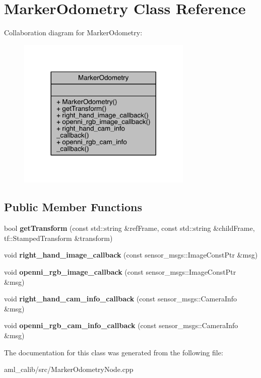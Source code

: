 \hypertarget{class_marker_odometry}{}\section{Marker\+Odometry Class Reference}
\label{class_marker_odometry}


Collaboration diagram for Marker\+Odometry\+:
\nopagebreak
\begin{figure}[H]
\begin{center}
\leavevmode
\includegraphics[width=236pt]{class_marker_odometry__coll__graph}
\end{center}
\end{figure}
\subsection*{Public Member Functions}
\begin{DoxyCompactItemize}
\item 
\hypertarget{class_marker_odometry_a991ccdf619ec3c08249f0e8c7b1dfb16}{}\label{class_marker_odometry_a991ccdf619ec3c08249f0e8c7b1dfb16} 
bool {\bfseries get\+Transform} (const std\+::string \&ref\+Frame, const std\+::string \&child\+Frame, tf\+::\+Stamped\+Transform \&transform)
\item 
\hypertarget{class_marker_odometry_a0830cb1778e608a0f3740ed7075d45b2}{}\label{class_marker_odometry_a0830cb1778e608a0f3740ed7075d45b2} 
void {\bfseries right\+\_\+hand\+\_\+image\+\_\+callback} (const sensor\+\_\+msgs\+::\+Image\+Const\+Ptr \&msg)
\item 
\hypertarget{class_marker_odometry_af6619fc8e9f0183bac7dc40c3a07d097}{}\label{class_marker_odometry_af6619fc8e9f0183bac7dc40c3a07d097} 
void {\bfseries openni\+\_\+rgb\+\_\+image\+\_\+callback} (const sensor\+\_\+msgs\+::\+Image\+Const\+Ptr \&msg)
\item 
\hypertarget{class_marker_odometry_adce78bf3c045cd8b6d543a10e926aeb4}{}\label{class_marker_odometry_adce78bf3c045cd8b6d543a10e926aeb4} 
void {\bfseries right\+\_\+hand\+\_\+cam\+\_\+info\+\_\+callback} (const sensor\+\_\+msgs\+::\+Camera\+Info \&msg)
\item 
\hypertarget{class_marker_odometry_a90f3cc35183a070f578f7f1f57b6c0d8}{}\label{class_marker_odometry_a90f3cc35183a070f578f7f1f57b6c0d8} 
void {\bfseries openni\+\_\+rgb\+\_\+cam\+\_\+info\+\_\+callback} (const sensor\+\_\+msgs\+::\+Camera\+Info \&msg)
\end{DoxyCompactItemize}


The documentation for this class was generated from the following file\+:\begin{DoxyCompactItemize}
\item 
aml\+\_\+calib/src/Marker\+Odometry\+Node.\+cpp\end{DoxyCompactItemize}
